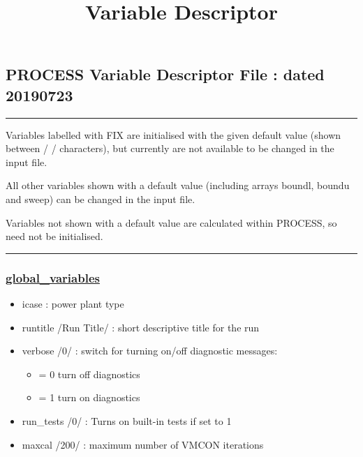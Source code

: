 \documentclass[]{article}
\title{Variable Descriptor}
\date{}
\providecommand{\tightlist}{%
  \setlength{\itemsep}{0pt}\setlength{\parskip}{0pt}}
\begin{document}
\maketitle

\hypertarget{process-variable-descriptor-file-dated-20190723}{%
\subsection{PROCESS Variable Descriptor File : dated
20190723}\label{process-variable-descriptor-file-dated-20190723}}

\begin{center}\rule{0.5\linewidth}{\linethickness}\end{center}

Variables labelled with FIX are initialised with the given default value
(shown between / / characters), but currently are not available to be
changed in the input file.

All other variables shown with a default value (including arrays boundl,
boundu and sweep) can be changed in the input file.

Variables not shown with a default value are calculated within PROCESS,
so need not be initialised.

\begin{center}\rule{0.5\linewidth}{\linethickness}\end{center}

\hypertarget{global_variables}{%
\subsubsection{\texorpdfstring{\href{global_variables.html}{global\_variables}}{global\_variables}}\label{global_variables}}

\begin{itemize}
\tightlist
\item
  icase : power plant type
\item
  runtitle /Run Title/ : short descriptive title for the run
\item
  verbose /0/ : switch for turning on/off diagnostic messages:

  \begin{itemize}
  \tightlist
  \item
    = 0 turn off diagnostics
  \item
    = 1 turn on diagnostics
  \end{itemize}
\item
  run\_tests /0/ : Turns on built-in tests if set to 1
\item
  maxcal /200/ : maximum number of VMCON iterations
\end{itemize}
\end{document}
